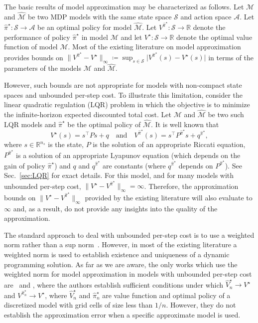 \documentclass[letterpaper, 10pt]{IEEEtran}
\newcommand*\ALPHABET{\mathcal}
\newcommand*\reals{\mathds{R}}
\begin{document}
The basic results of model approximation may be characterized as follows. Let $\ALPHABET M$ and $\hat{\ALPHABET M}$ be two MDP models with the same state space $\ALPHABET S$ and action space $\ALPHABET A$. Let $\hat \pi^\star \colon \ALPHABET S \to \ALPHABET A$ be an optimal policy for model $\hat {\ALPHABET M}$. Let $V^{\hat \pi^\star} \colon \ALPHABET S \to \reals$ denote the performance of policy $\hat \pi^\star$ in model $\ALPHABET M$ and let $V^\star \colon \ALPHABET S \to \reals$ denote the optimal value function of model $\ALPHABET M$. Most of the existing literature on model approximation provides bounds on $\| V^{\hat \pi^\star} - V^\star \|_{\infty} \coloneqq \sup_{s \in \ALPHABET S} \bigl| V^{\hat \pi^\star}(s) - V^\star(s) \bigr|$ in terms of the parameters of the models $\ALPHABET M$ and $\hat {\ALPHABET M}$. 

However, such bounds are not appropriate for models  with non-compact state spaces and unbounded per-step cost. To illustrate this limitation, consider the linear quadratic regulation (LQR) problem in which the objective is to minimize the infinite-horizon expected discounted total cost. Let $\ALPHABET M$ and $\hat {\ALPHABET M}$ be two such LQR models and $\hat \pi^\star$ be the optimal policy of $\hat {\ALPHABET M}$. It is well known that
\[
   V^\star(s) = s^\intercal P s + q
   \quad\text{and}\quad
   V^{\hat \pi^\star}(s) = s^\intercal P^{\hat \pi^\star} s + q^{\hat \pi^\star},
\]
where $s \in \reals^{n_s}$ is the state, $P$ is the solution of an appropriate Riccati equation, $P^{\hat \pi^\star}$ is a solution of an appropriate Lyapunov equation (which depends on the gain of policy $\hat \pi^\star$) and $q$ and $q^{\hat \pi^\star}$ are constants (where $q^{\hat \pi^\star}$ depends on $P^{\hat \pi^\star}$).  See Sec.~\ref{sec:LQR} for exact details.
For this model, and for many models with unbounded per-step cost, $\| V^\star - V^{\hat \pi^\star} \|_\infty = \infty$. Therefore, the approximation bounds on $\|V^\star - V^{\hat \pi^\star}\|_\infty$ provided by the existing literature will also evaluate to $\infty$ and, as a result, do not provide any insights into the quality of the approximation. 

The standard approach to deal with unbounded per-step cost is to use a weighted norm rather than a sup norm~\cite{muller1997,saldi2017asymptotic,saldi2018finite,hernandez2012discrete,hernandez2012further}.
However, in most of the existing literature a weighted norm is used to establish existence and uniqueness of a dynamic programming solution. As far as we are aware, the only works which use the weighted norm for model approximation in models with unbounded per-step cost are~\cite{saldi2017asymptotic} and \cite[Chapter 4]{saldi2018finite}, where the authors establish sufficient conditions under which $\hat V^\star_n \to V^\star$ and $V^{\hat \pi^\star_n} \to V^\star$, where $\hat V^\star_n$ and $\hat \pi^\star_n$ are value function and optimal policy of a discretized model with grid cells of size less than $1/n$. However, they do not establish the approximation error when a specific approximate model is used.
\end{document}
